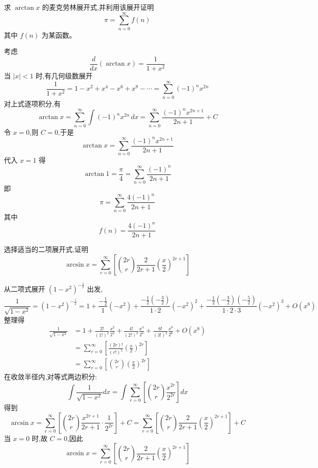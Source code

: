 \begin{questions}
    \question 求 $\arctan x$ 的麦克劳林展开式,并利用该展开证明
    \[
    \pi=\sum_{n=0}^{\infty} f(n)
    \]
    其中 $f(n)$ 为某函数。
    \begin{solution}
        考虑
        \[
        \frac{d}{dx}(\arctan x)=\frac{1}{1+x^{2}}
        \]
        当 $|x|<1$ 时,有几何级数展开
        \[
        \frac{1}{1+x^{2}}=1-x^{2}+x^{4}-x^{6}+x^{8}-\cdots=\sum_{n=0}^{\infty}(-1)^{n}x^{2n}
        \]
        对上式逐项积分,有
        \[
        \arctan x=\sum_{n=0}^{\infty}\int(-1)^{n}x^{2n}\,dx =\sum_{n=0}^{\infty}\frac{(-1)^{n}x^{2n+1}}{2n+1}+C
        \]
        令 $x=0$,则 $C=0$,于是
        \[
        \arctan x=\sum_{n=0}^{\infty}\frac{(-1)^{n}x^{2n+1}}{2n+1}
        \]
        代入 $x=1$ 得
        \[
        \arctan 1=\frac{\pi}{4}=\sum_{n=0}^{\infty}\frac{(-1)^{n}}{2n+1}
        \]
        即
        \[
        \pi=\sum_{n=0}^{\infty}\frac{4(-1)^{n}}{2n+1}
        \]
        其中
        \[
        f(n)=\frac{4(-1)^{n}}{2n+1}
        \]
    \end{solution}

    \question 选择适当的二项展开式,证明
    \[
    \arcsin x = \sum_{r=0}^{\infty} \left[ \binom{2r}{r}\frac{2}{2r+1}\left(\frac{x}{2}\right)^{2r+1} \right]
    \]
    \begin{solution}
        从二项式展开 $(1-x^2)^{-\frac{1}{2}}$ 出发,
        \[
        \frac{1}{\sqrt{1-x^2}} = (1-x^2)^{-\frac{1}{2}} = 1 + \frac{-\frac{1}{2}}{1}(-x^2) + \frac{-\frac{1}{2}(-\frac{3}{2})}{1\cdot 2}(-x^2)^2 + \frac{-\frac{1}{2}(-\frac{3}{2})(-\frac{5}{2})}{1\cdot 2\cdot 3}(-x^2)^3 + O(x^8)
        \]
        整理得
        \begin{align*}
        \frac{1}{\sqrt{1-x^2}} 
        &= 1 + \frac{2!}{(1!)^2} \frac{x^2}{2^2} + \frac{4!}{(2!)^2} \frac{x^4}{2^4} + \frac{6!}{(3!)^2} \frac{x^6}{2^6} + O(x^8)  \\
        &= \sum_{r=0}^{\infty} \left[ \frac{(2r)!}{(r!)^2} \left( \frac{x}{2} \right)^{2r} \right] \\
        &= \sum_{r=0}^{\infty} \left[ \binom{2r}{r} \left( \frac{x}{2} \right)^{2r} \right] 
        \end{align*}
        在收敛半径内,对等式两边积分:
        \[ 
        \int \frac{1}{\sqrt{1-x^2}} dx = \int \sum_{r=0}^{\infty} \left[ \binom{2r}{r} \frac{x^{2r}}{2^{2r}} \right] dx 
        \]
        得到
        \[ 
        \arcsin x = \sum_{r=0}^{\infty} \left[ \binom{2r}{r} \frac{x^{2r+1}}{2r+1} \cdot \frac{1}{2^{2r}} \right] + C =\sum_{r=0}^{\infty} \left[ \binom{2r}{r} \frac{2}{2r+1} \left( \frac{x}{2} \right)^{2r+1} \right] +C
        \]
        当 $x=0$ 时,故 $C=0$,因此
        \[ 
        \arcsin x = \sum_{r=0}^{\infty} \left[ \binom{2r}{r} \frac{2}{2r+1} \left( \frac{x}{2} \right)^{2r+1} \right] 
        \]
    \end{solution}


\end{questions}
